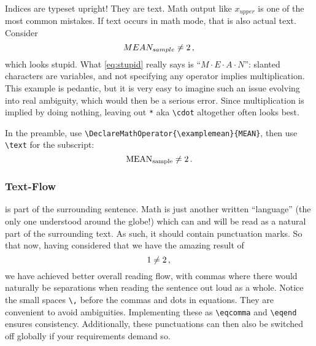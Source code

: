 Indices are typeset upright!
They are text.
Math output like \(x_{upper}\) is one of the most common mistakes.
If text occurs in math mode, that is also actual text.
Consider
\begin{equation}\label{eq:stupid}
    MEAN_{sample} \neq \num{2}\,,{}
\end{equation}
which looks stupid.
What \cref{eq:stupid} really says is \enquote{\(M \cdot E \cdot A \cdot N\)}:
slanted characters are variables, and not specifying any operator implies
multiplication.
This example is pedantic, but it is very easy to imagine such an issue evolving
into real ambiguity, which would then be a serious error.
Since multiplication is implied by doing nothing, leaving out \verb|*| aka
\verb|\cdot| altogether often looks best.

In the preamble, use \verb|\DeclareMathOperator{\examplemean}{MEAN}|, then use
\verb|\text| for the subscript:
\begin{equation}\label{eq:eqend}
    \examplemean_{\text{sample}} \neq \num{2} \eqend{}
\end{equation}

\subsubsection{Text-Flow}

 is part of the surrounding sentence.
Math is just another written \enquote{language} (the only one understood around
the globe!) which can and will be read as a natural part of the surrounding text.
As such, it should contain punctuation marks.
So that now, having considered that we have the amazing result of
\begin{equation}
    \num{1} \neq \num{2} \,,{}
\end{equation}
we have achieved better overall reading flow, with commas where there would
naturally be separations when reading the sentence out loud as a whole.
Notice the small spaces \verb|\,| before the commas and dots in equations.
They are convenient to avoid ambiguities.
Implementing these as \verb|\eqcomma| and \verb|\eqend| ensures consistency.
Additionally, these punctuations can then also be switched off globally if your
requirements demand so.

